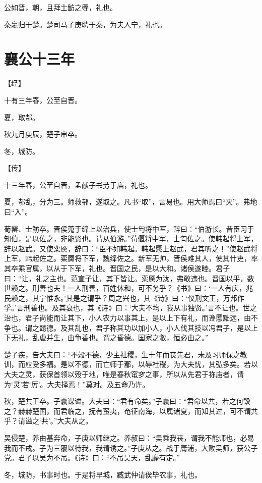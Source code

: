 \documentclass[a4paper,12pt,UTF8,twoside]{ctexbook}
\begin{document}
公如晋，朝，且拜士鲂之辱，礼也。

秦嬴归于楚。楚司马子庚聘于秦，为夫人宁，礼也。

\section{襄公十三年}


【经】

十有三年春，公至自晋。

夏，取邿。

秋九月庚辰，楚子审卒。

冬，城防。

【传】

十三年春，公至自晋，孟献子书劳于庙，礼也。

夏，邿乱，分为三。师救邿，遂取之。凡书“取”，言易也。用大师焉曰“灭”。弗地曰“入”。

荀罃、士鲂卒。晋侯蒐于绵上以治兵，使士匄将中军，辞曰：“伯游长。昔臣习于知伯，是以佐之，非能贤也。请从伯游。”荀偃将中军，士匄佐之。使韩起将上军，辞以赵武。又使栾黡，辞曰：“臣不如韩起。韩起愿上赵武，君其听之！”使赵武将上军，韩起佐之。栾黡将下军，魏绛佐之。新军无帅，晋侯难其人，使其什吏，率其卒乘官属，以从于下军，礼也。晋国之民，是以大和。诸侯遂睦。君子曰：“让，礼之主也。范宣子让，其下皆让。栾黡为汰，弗敢违也。晋国以平，数世赖之。刑善也夫！一人刑善，百姓休和，可不务乎？《书》曰：‘一人有庆，兆民赖之，其宁惟永。’其是之谓乎？周之兴也，其《诗》曰：‘仪刑文王，万邦作孚。’言刑善也。及其衰也，其《诗》曰：‘大夫不均，我从事独贤。’言不让也。世之治也，君子尚能而让其下，小人农力以事其上，是以上下有礼，而谗慝黜远，由不争也。谓之懿德。及其乱也，君子称其功以加小人，小人伐其技以冯君子，是以上下无礼，乱虐并生，由争善也。谓之昏德。国家之敝，恒必由之。”

楚子疾，告大夫曰：“不穀不德，少主社稷，生十年而丧先君，未及习师保之教训，而应受多福。是以不德，而亡师于鄢，以辱社稷，为大夫忧，其弘多矣。若以大夫之灵，获保首领以殁于地，唯是春秋窀穸之事，所以从先君于祢庙者，请为‘灵’若‘厉’。大夫择焉！”莫对。及五命乃许。

秋，楚共王卒。子囊谋谥。大夫曰：“君有命矣。”子囊曰：“君命以共，若之何毁之？赫赫楚国，而君临之，抚有蛮夷，奄征南海，以属诸夏，而知其过，可不谓共乎？请谥之‘共’。”大夫从之。

吴侵楚，养由基奔命，子庚以师继之。养叔曰：“吴乘我丧，谓我不能师也，必易我而不戒。子为三覆以待我，我请诱之。”子庚从之。战于庸浦，大败吴师，获公子党。君子以吴为不吊。《诗》曰：“不吊昊天，乱靡有定。”

冬，城防，书事时也。于是将早城，臧武仲请俟毕农事，礼也。
\end{document}
